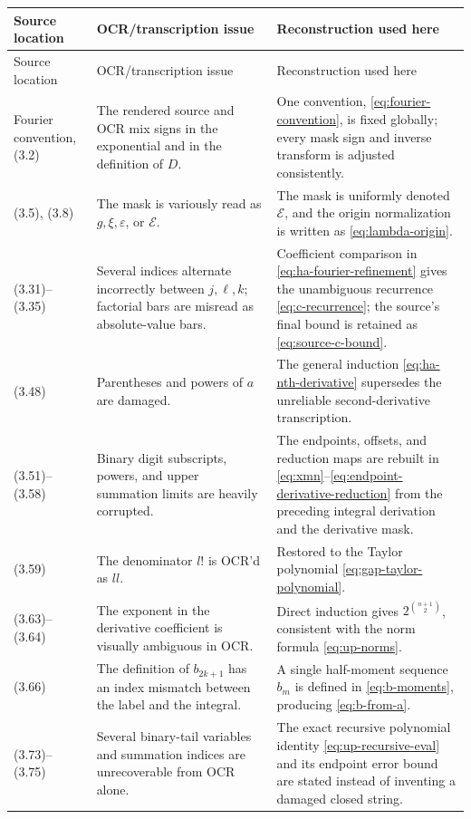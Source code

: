 \documentclass[11pt]{article}
\theoremstyle{definition}
\theoremstyle{remark}
\begin{document}
\begin{longtable}{>{\raggedright\arraybackslash}p{} >{\raggedright\arraybackslash}p{} >{\raggedright\arraybackslash}p{}}
\toprule
Source location & OCR/transcription issue & Reconstruction used here\\
\midrule
\endfirsthead
\toprule
Source location & OCR/transcription issue & Reconstruction used here\\
\midrule
\endhead
Fourier convention, (3.2) & The rendered source and OCR mix signs in the exponential and in the definition of \(D\). & One convention, \eqref{eq:fourier-convention}, is fixed globally; every mask sign and inverse transform is adjusted consistently.\\
(3.5), (3.8) & The mask is variously read as \(g,\xi,\varepsilon\), or \(\mathcal E\). & The mask is uniformly denoted \(\mathcal E\), and the origin normalization is written as \eqref{eq:lambda-origin}.\\
(3.31)--(3.35) & Several indices alternate incorrectly between \(j,\ell,k\); factorial bars are misread as absolute-value bars. & Coefficient comparison in \eqref{eq:ha-fourier-refinement} gives the unambiguous recurrence \eqref{eq:c-recurrence}; the source's final bound is retained as \eqref{eq:source-c-bound}.\\
(3.48) & Parentheses and powers of \(a\) are damaged. & The general induction \eqref{eq:ha-nth-derivative} supersedes the unreliable second-derivative transcription.\\
(3.51)--(3.58) & Binary digit subscripts, powers, and upper summation limits are heavily corrupted. & The endpoints, offsets, and reduction maps are rebuilt in \eqref{eq:xmn}--\eqref{eq:endpoint-derivative-reduction} from the preceding integral derivation and the derivative mask.\\
(3.59) & The denominator \(l!\) is OCR'd as \(ll\). & Restored to the Taylor polynomial \eqref{eq:gap-taylor-polynomial}.\\
(3.63)--(3.64) & The exponent in the derivative coefficient is visually ambiguous in OCR. & Direct induction gives \(2^{\binom{n+1}{2}}\), consistent with the norm formula \eqref{eq:up-norms}.\\
(3.66) & The definition of \(b_{2k+1}\) has an index mismatch between the label and the integral. & A single half-moment sequence \(b_m\) is defined in \eqref{eq:b-moments}, producing \eqref{eq:b-from-a}.\\
(3.73)--(3.75) & Several binary-tail variables and summation indices are unrecoverable from OCR alone. & The exact recursive polynomial identity \eqref{eq:up-recursive-eval} and its endpoint error bound are stated instead of inventing a damaged closed string.\\

\end{longtable}
\end{document}
